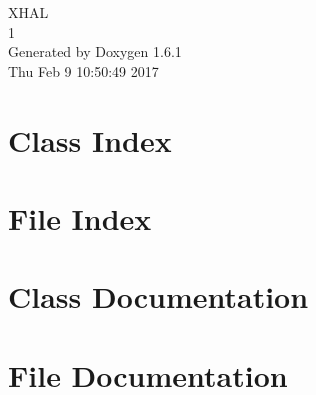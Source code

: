 \documentclass[a4paper]{book}
\begin{document}
\hypersetup{pageanchor=false}
\begin{titlepage}
\vspace*{7cm}
\begin{center}
{\Large XHAL \\[1ex]\large 1 }\\
\vspace*{1cm}
{\large Generated by Doxygen 1.6.1}\\
\vspace*{0.5cm}
{\small Thu Feb 9 10:50:49 2017}\\
\end{center}
\end{titlepage}
\clearemptydoublepage
{}
\tableofcontents
\clearemptydoublepage
{}
\hypersetup{pageanchor=true}
\chapter{Class Index}

\chapter{File Index}

\chapter{Class Documentation}










\chapter{File Documentation}



\printindex
\end{document}
